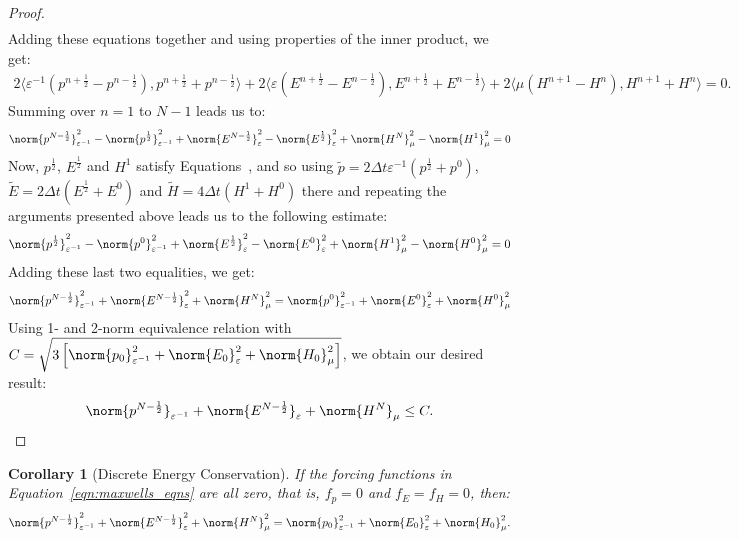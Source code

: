 \documentclass{amsart}
\theoremstyle{thmstyleone}%
\theoremstyle{thmstyletwo}%
\theoremstyle{thmstylethree}%
\newtheorem{corollary}{Corollary}[theorem]
\newcommand{\aInnerproduct}[2]{\bigl\langle #1, #2 \bigr\rangle}
\begin{document}
\begin{proof}
\begin{multline*}
\end{multline*}
Adding these equations together and using properties of the inner product, we get:
\begin{multline*}
  2 \aInnerproduct{\varepsilon^{-1} \left( p^{n + \frac{1}{2}} - p^{n - \frac{1}{2}} \right)}{p^{n + \frac{1}{2}} + p^{n - \frac{1}{2}}} + 2 \aInnerproduct{\varepsilon \left(E^{n + \frac{1}{2}} - E^{n - \frac{1}{2}} \right)}{E^{n + \frac{1}{2}} + E^{n - \frac{1}{2}}} + 2 \aInnerproduct{\mu \left( H^{n + 1} - H^{n} \right)}{H^{n + 1} + H^n} = 0.
\end{multline*}
Summing over $n = 1$ to $N - 1$ leads us to:
\[
  \norm{p^{N - \frac{1}{2}}}^2_{\varepsilon^{-1}} - \norm{p^\frac{1}{2}}^2_{\varepsilon^{-1}} + \norm{E^{N - \frac{1}{2}}}^2_{\varepsilon} - \norm{E^\frac{1}{2}}^2_{\varepsilon} + \norm{H^N}^2_{\mu} - \norm{H^1}^2_{\mu} = 0
\]
Now, $p^{\frac{1}{2}}$, $E^{\frac{1}{2}}$ and $H^1$ satisfy Equations~, and so using $\widetilde{p} = 2 \Delta t \varepsilon^{-1} \left( p^{\frac{1}{2}} + p^0 \right)$, $\widetilde{E} = 2 \Delta t \left(E^{\frac{1}{2}} + E^0 \right)$ and $\widetilde{H} = 4 \Delta t \left(H^{1} + H^0 \right)$ there and repeating the arguments presented above leads us to the following estimate:
\[
  \norm{p^{\frac{1}{2}}}^2_{\varepsilon^{-1}}  - \norm{p^0}^2_{\varepsilon^{-1}} + \norm{E^{\frac{1}{2}}}^2_{\varepsilon} - \norm{E^0}^2_{\varepsilon} + \norm{H^{1}}^2_{\mu} - \norm{H^0}^2_{\mu} = 0
\]
Adding these last two equalities, we get:
\[
  \norm{p^{N - \frac{1}{2}}}^2_{\varepsilon^{-1}} + \norm{E^{N - \frac{1}{2}}}^2_{\varepsilon} + \norm{H^N}^2_{\mu} = \norm{p^0}^2_{\varepsilon^{-1}} + \norm{E^0}^2_{\varepsilon} + \norm{H^0}^2_{\mu}
\]
Using 1- and 2-norm equivalence relation with $C = \sqrt{3 \left[\norm{p_0}^2_{\varepsilon^{-1}} + \norm{E_0}^2_{\varepsilon} + \norm{H_0}^2_{\mu} \right]}$, we obtain our desired result:
\[
  \norm{p^{N - \frac{1}{2}}}_{\varepsilon^{-1}} + \norm{E^{N - \frac{1}{2}}}_{\varepsilon} + \norm{H^N}_{\mu} \le C. \qedhere
\]
\end{proof}

\begin{corollary}[Discrete Energy Conservation]\label{corr:dscrt_enrgy_cnsrvtn_lf4}
If the forcing functions in Equation~\eqref{eqn:maxwells_eqns} are all zero, that is, $f_p = 0$ and $f_E = f_H = 0$, then:
\[
  \norm{p^{N - \frac{1}{2}}}^2_{\varepsilon^{-1}} + \norm{E^{N - \frac{1}{2}}}^2_{\varepsilon} + \norm{H^N}^2_{\mu} = \norm{p_0}^2_{\varepsilon^{-1}} + \norm{E_0}^2_{\varepsilon} + \norm{H_0}^2_{\mu}.
\]
\end{corollary}
\end{document}
